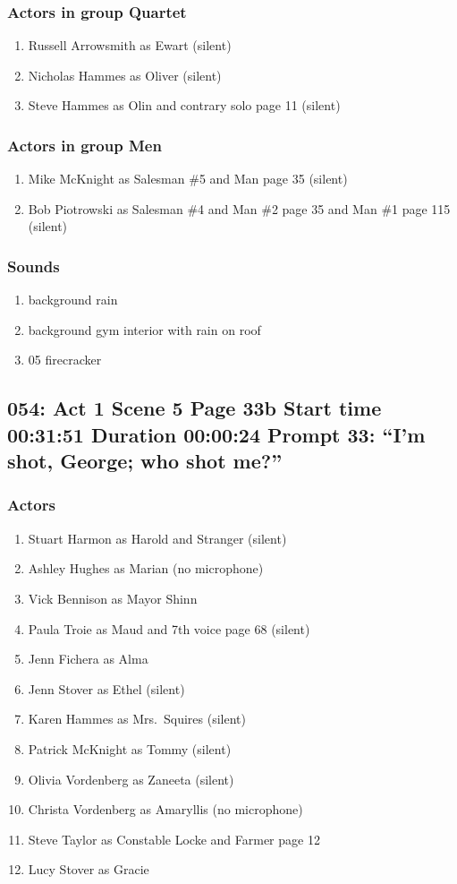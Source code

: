 \subsubsection{Actors in group Quartet}
\begin{enumerate}
\item Russell Arrowsmith as Ewart (silent)
\item Nicholas Hammes as Oliver (silent)
\item Steve Hammes as Olin and contrary solo page 11 (silent)
\end{enumerate}
\subsubsection{Actors in group Men}
\begin{enumerate}
\item Mike McKnight as Salesman \#5 and Man page 35 (silent)
\item Bob Piotrowski as Salesman \#4 and Man \#2 page 35 and Man \#1 page 115 (silent)
\end{enumerate}

\subsubsection{Sounds}
\begin{enumerate}
\item background rain
\item background gym interior with rain on roof
\item 05 firecracker
\end{enumerate}
\subsection{054: Act 1 Scene 5 Page 33b Start time 00:31:51 Duration 00:00:24 Prompt 33: ``I'm shot, George; who shot me?''}

\subsubsection{Actors}
\begin{enumerate}
\item Stuart Harmon as Harold and Stranger (silent)
\item Ashley Hughes as Marian (no microphone)
\item Vick Bennison as Mayor Shinn
\item Paula Troie as Maud and 7th voice page 68 (silent)
\item Jenn Fichera as Alma
\item Jenn Stover as Ethel (silent)
\item Karen Hammes as Mrs.~Squires (silent)
\item Patrick McKnight as Tommy (silent)
\item Olivia Vordenberg as Zaneeta (silent)
\item Christa Vordenberg as Amaryllis (no microphone)
\item Steve Taylor as Constable Locke and Farmer page 12
\item Lucy Stover as Gracie
\end{enumerate}
